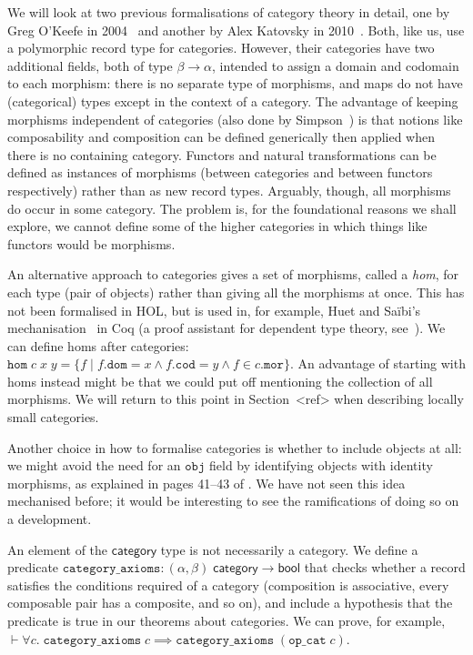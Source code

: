\documentclass[twoside,titlepage,11pt]{article}
\begin{document}
We will look at two previous formalisations of category theory in detail, one by Greg O'Keefe in 2004~\cite{DBLP:journals/entcs/OKeefe04} and another by Alex Katovsky in 2010~\cite{Katovsky}.
Both, like us, use a polymorphic record type for categories.
However, their categories have two additional fields, both of type $\beta\to\alpha$, intended to assign a domain and codomain to each morphism: there is no separate type of morphisms, and maps do not have (categorical) types except in the context of a category.
The advantage of keeping morphisms independent of categories (also done by Simpson~\cite{Simpson04}) is that notions like composability and composition can be defined generically then applied when there is no containing category.
Functors and natural transformations can be defined as instances of morphisms (between categories and between functors respectively) rather than as new record types.
Arguably, though, all morphisms do occur in some category.
The problem is, for the foundational reasons we shall explore, we cannot define some of the higher categories in which things like functors would be morphisms.

An alternative approach to categories gives a set of morphisms, called a \emph{hom}, for each type (pair of objects) rather than giving all the morphisms at once.
This has not been formalised in HOL, but is used in, for example, Huet and Sa{\"i}bi's mechanisation~\cite{DBLP:conf/birthday/HuetS00} in Coq (a proof assistant for dependent type theory, see~\cite{DBLP:conf/tphol/Bertot08}).
We can define homs after categories: $\mathtt{hom}\;c\;x\;y=\{f\mid f.\mathtt{dom}=x\land f.\mathtt{cod}=y\land f\in c.\mathtt{mor}\}$.
An advantage of starting with homs instead might be that we could put off mentioning the collection of all morphisms.
We will return to this point in Section~<ref> when describing locally small categories.

Another choice in how to formalise categories is whether to include objects at all: we might avoid the need for an $\mathtt{obj}$ field by identifying objects with identity morphisms, as explained in pages 41--43 of \cite{DBLP:books/daglib/0023249}.
We have not seen this idea mechanised before; it would be interesting to see the ramifications of doing so on a development.

An element of the $\mathsf{category}$ type is not necessarily a category.
We define a predicate $\mathtt{category\_axioms}:(\alpha,\beta)\;\mathsf{category}\to\mathsf{bool}$ that checks whether a record satisfies the conditions required of a category (composition is associative, every composable pair has a composite, and so on), and include a hypothesis that the predicate is true in our theorems about categories.
We can prove, for example, $\vdash\forall{c}.\;\mathtt{category\_axioms}\;c\implies\mathtt{category\_axioms}\;(\mathtt{op\_cat}\;c)$.
\end{document}
